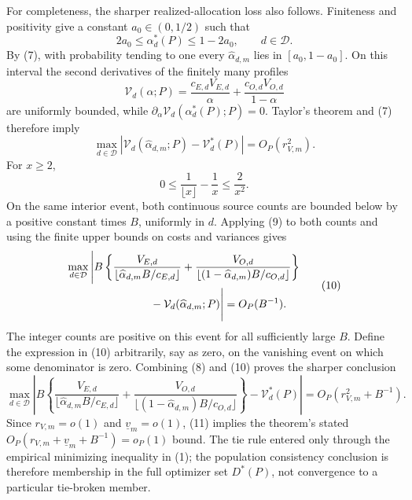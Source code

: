 For completeness, the sharper realized-allocation loss also follows.  Finiteness and positivity give a constant \(a_0\in(0,1/2)\) such that
\[
 2a_0\le\alpha_d^*(P)\le1-2a_0,
 \qquad d\in\mathcal D.
\]
By (7), with probability tending to one every \(\widehat\alpha_{d,m}\) lies in \([a_0,1-a_0]\).  On this interval the second derivatives of the finitely many profiles
\[
 \mathcal V_d(\alpha;P)
 =\frac{c_{E,d}V_{E,d}}{\alpha}
  +\frac{c_{O,d}V_{O,d}}{1-\alpha}
\]
are uniformly bounded, while
\(\partial_\alpha\mathcal V_d(\alpha_d^*(P);P)=0\).  Taylor's theorem and (7) therefore imply
\[
 \max_{d\in\mathcal D}
 \left|\mathcal V_d(\widehat\alpha_{d,m};P)
       -\mathcal V_d^*(P)\right|=O_P(r_{V,m}^2).              \tag{8}
\]
For \(x\ge2\),
\[
 0\le\frac1{\lfloor x\rfloor}-\frac1x\le\frac2{x^2}.       \tag{9}
\]
On the same interior event, both continuous source counts are bounded below by a positive constant times \(B\), uniformly in \(d\).  Applying (9) to both counts and using the finite upper bounds on costs and variances gives
\[
\begin{aligned}
 \max_{d\in\mathcal D}\Bigg|&B\left\{
 \frac{V_{E,d}}{\lfloor\widehat\alpha_{d,m}B/c_{E,d}\rfloor}
 +\frac{V_{O,d}}{\lfloor(1-\widehat\alpha_{d,m})B/c_{O,d}\rfloor}
 \right\}\\
 &\hspace{18mm}-\mathcal V_d(\widehat\alpha_{d,m};P)\Bigg|
 =O_P(B^{-1}).
\end{aligned}                                                 \tag{10}
\]
The integer counts are positive on this event for all sufficiently large \(B\).  Define the expression in (10) arbitrarily, say as zero, on the vanishing event on which some denominator is zero.  Combining (8) and (10) proves the sharper conclusion
\[
\max_{d\in\mathcal D}\left|B\left\{
 \frac{V_{E,d}}{\lfloor\widehat\alpha_{d,m}B/c_{E,d}\rfloor}
 +\frac{V_{O,d}}{\lfloor(1-\widehat\alpha_{d,m})B/c_{O,d}\rfloor}
 \right\}-\mathcal V_d^*(P)\right|
 =O_P(r_{V,m}^2+B^{-1}).                                     \tag{11}
\]
Since \(r_{V,m}=o(1)\) and \(\underline v_m=o(1)\), (11) implies the theorem's stated \(O_P(r_{V,m}+\underline v_m+B^{-1})=o_P(1)\) bound.  The tie rule entered only through the empirical minimizing inequality in (1); the population consistency conclusion is therefore membership in the full optimizer set \(D^*(P)\), not convergence to a particular tie-broken member.